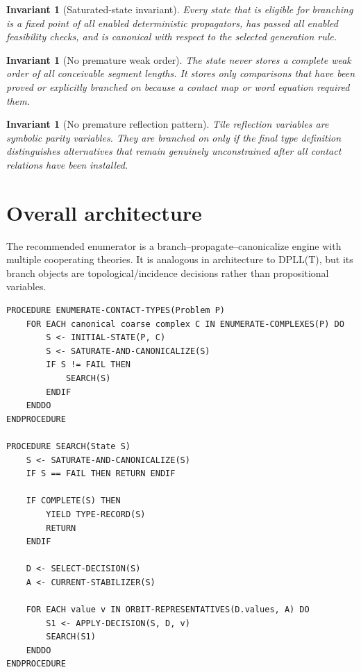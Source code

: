 \documentclass[11pt]{article}
\newtheorem{invariant}[definition]{Invariant}
\begin{document}
\begin{invariant}[Saturated-state invariant]
Every state that is eligible for branching is a fixed point of all enabled deterministic propagators, has passed all enabled feasibility checks, and is canonical with respect to the selected generation rule.
\end{invariant}

\begin{invariant}[No premature weak order]
The state never stores a complete weak order of all conceivable segment lengths.  It stores only comparisons that have been proved or explicitly branched on because a contact map or word equation required them.
\end{invariant}

\begin{invariant}[No premature reflection pattern]
Tile reflection variables are symbolic parity variables.  They are branched on only if the final type definition distinguishes alternatives that remain genuinely unconstrained after all contact relations have been installed.
\end{invariant}

\section{Overall architecture}
\label{sec:architecture}

The recommended enumerator is a branch--propagate--canonicalize engine with multiple cooperating theories.  It is analogous in architecture to DPLL(T), but its branch objects are topological/incidence decisions rather than propositional variables.

\begin{lstlisting}[caption={Top-level enumeration.},label={alg:top}]
PROCEDURE ENUMERATE-CONTACT-TYPES(Problem P)
    FOR EACH canonical coarse complex C IN ENUMERATE-COMPLEXES(P) DO
        S <- INITIAL-STATE(P, C)
        S <- SATURATE-AND-CANONICALIZE(S)
        IF S != FAIL THEN
            SEARCH(S)
        ENDIF
    ENDDO
ENDPROCEDURE

PROCEDURE SEARCH(State S)
    S <- SATURATE-AND-CANONICALIZE(S)
    IF S == FAIL THEN RETURN ENDIF

    IF COMPLETE(S) THEN
        YIELD TYPE-RECORD(S)
        RETURN
    ENDIF

    D <- SELECT-DECISION(S)
    A <- CURRENT-STABILIZER(S)

    FOR EACH value v IN ORBIT-REPRESENTATIVES(D.values, A) DO
        S1 <- APPLY-DECISION(S, D, v)
        SEARCH(S1)
    ENDDO
ENDPROCEDURE
\end{lstlisting}
\end{document}
